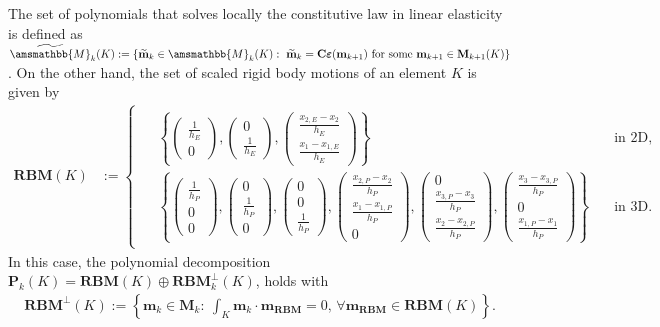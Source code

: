 \documentclass[fleqn,a4paper]{cas-sc}
\newcommand{\beps}{\boldsymbol{\varepsilon}}
\newcommand{\bC}{\mathbf{C}}
\newcommand{\bm}{\mathbf{m}}
\newcommand{\0}{\boldsymbol{0}}
\newcommand\bP{\mathbf{P}}
\newcommand\bM{\mathbf{M}}
\newcommand\bbM{\amsmathbb{M}}
\numberwithin{equation}{section}
\numberwithin{figure}{section}
\begin{document}
The set of polynomials that solves locally the constitutive law in linear elasticity is defined as $\widetilde{\bbM}_k(K):= \{\widetilde{\bm}_k \in \bbM_k(K):\ \widetilde{\bm}_k=\bC\beps(\bm_{k+1})\ \text{for some}\ \bm_{k+1}\in \bM_{k+1}(K)\}$. On the other hand, the set of scaled rigid body motions of an element $K$ is given by
\begin{align*}
    \textbf{RBM}(K) &:= 
    \begin{cases}
        \begin{aligned}
            &\left\{ \begin{pmatrix} \frac{1}{h_E} \\ 0 \end{pmatrix}, \begin{pmatrix} 0 \\ \frac{1}{h_E} \end{pmatrix}, \begin{pmatrix} \frac{x_{2,E}-x_2}{h_E} \\ \frac{x_1-x_{1,E}}{h_E} \end{pmatrix} \right\}&\quad \text{in 2D},\\
            &\left\{ \begin{pmatrix} \frac{1}{h_P} \\ 0 \\ 0 \end{pmatrix}, \begin{pmatrix} 0 \\ \frac{1}{h_P} \\ 0 \end{pmatrix}, \begin{pmatrix} 0 \\ 0 \\ \frac{1}{h_P} \end{pmatrix}, \begin{pmatrix} \frac{x_{2,P}-x_2}{h_P} \\ \frac{x_1-x_{1,P}}{h_P} \\ 0 \end{pmatrix}, \begin{pmatrix} 0 \\ \frac{x_{3,P}-x_3}{h_P} \\ \frac{x_2-x_{2,P}}{h_P} \end{pmatrix}, \begin{pmatrix} \frac{x_3-x_{3,P}}{h_P} \\ 0 \\ \frac{x_{1,P}-x_1}{h_P} \end{pmatrix}\right\} &\quad \text{in 3D}.
        \end{aligned}
    \end{cases}
\end{align*}
In this case, the polynomial decomposition $\bP_k(K) = \textbf{RBM}(K) \oplus \textbf{RBM}^\perp_k(K)$, holds with
\begin{align*}
    \textbf{RBM}^\perp(K) := \left\{ \bm_k \in \bM_k: \ \int_{K} \bm_k \cdot \bm_{{\textbf{RBM}}} = 0 ,\, \forall \bm_{{\textbf{RBM}}}\in  \textbf{RBM}(K) \right\}.
\end{align*}
\end{document}
